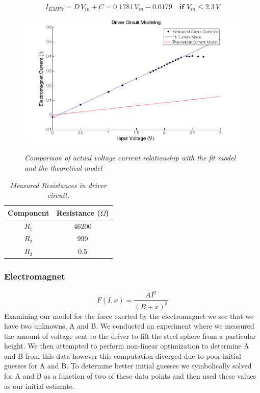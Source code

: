 \documentclass{article}
\theoremstyle{plain}
\theoremstyle{definition}
\theoremstyle{remark}
\begin{document}
$$ I_{EM Fit} = D \, V_{in} + C = 0.1781 \, V_{in} - 0.0179  \quad \textbf{if } V_{in} \leq 2.3 \, V $$

\begin{figure}
\begin{center}
\includegraphics[width = 13cm]{DriverCircuitModel.png}
\label{Q1_d2}
\caption{\emph{Comparison of actual voltage current relationship with the fit model and the theoretical model}}
\end{center}
\end{figure}

\begin{table}
\begin{center}
    \begin{tabular}{|c|c|}
        \hline
        Component & Resistance ($\Omega$) \\ \hline
        $R_{1}$   & 46200                 \\ 
        $R_{2}$   & 999                   \\ 
        $R_{3}$   & 0.5                   \\
        \hline
    \end{tabular}
\caption{\emph{Measured Resistances in driver circuit.}}
\label{Q1_dt3}
\end{center}
\end{table}

\subsubsection*{Electromagnet}
$$ F(I,x) = \frac{A I^2}{(B+x)^2} $$
Examining our model for the force exerted by the electromagnet we see that we have two unknowns, A and B.  We conducted an experiment where we measured the amount of voltage sent to the driver to lift the steel sphere from a particular height.  We then attempted to perform non-linear optimization to determine A and B from this data however this computation diverged due to poor initial guesses for A and B.  To determine better initial guesses we symbolically solved for A and B as a function of two of these data points and then used these values as our initial estimate.  
\end{document}
